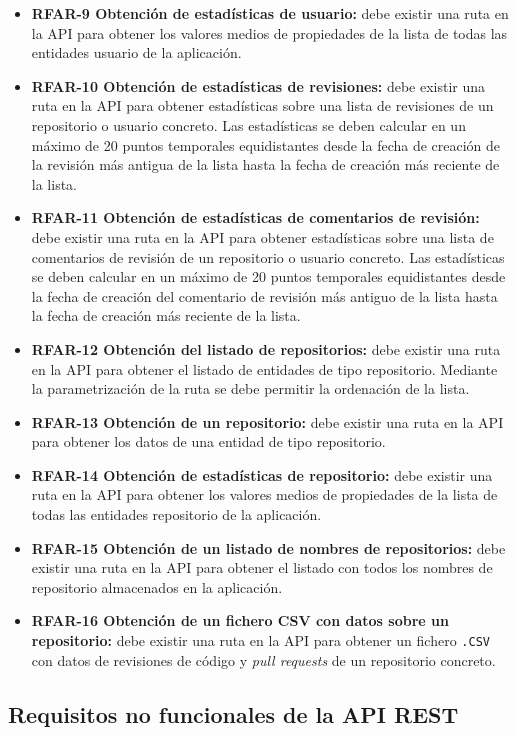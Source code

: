 \begin{itemize}
	\item \textbf{RFAR-9 Obtención de estadísticas de usuario:} debe existir una ruta en la API para obtener los valores medios de propiedades de la lista de todas las entidades usuario de la aplicación.
	\item \textbf{RFAR-10 Obtención de estadísticas de revisiones:} debe existir una ruta en la API para obtener estadísticas sobre una lista de revisiones de un repositorio o usuario concreto. Las estadísticas se deben calcular en un máximo de 20 puntos temporales equidistantes desde la fecha de creación de la revisión más antigua de la lista hasta la fecha de creación más reciente de la lista.
	\item \textbf{RFAR-11 Obtención de estadísticas de comentarios de revisión:} debe existir una ruta en la API para obtener estadísticas sobre una lista de comentarios de revisión de un repositorio o usuario concreto. Las estadísticas se deben calcular en un máximo de 20 puntos temporales equidistantes desde la fecha de creación del comentario de revisión más antiguo de la lista hasta la fecha de creación más reciente de la lista.
	\item \textbf{RFAR-12 Obtención del listado de repositorios:} debe existir una ruta en la API para obtener el listado de entidades de tipo repositorio. Mediante la parametrización de la ruta se debe permitir la ordenación de la lista.
	\item \textbf{RFAR-13 Obtención de un repositorio:} debe existir una ruta en la API para obtener los datos de una entidad de tipo repositorio.
	\item \textbf{RFAR-14 Obtención de estadísticas de repositorio:} debe existir una ruta en la API para obtener los valores medios de propiedades de la lista de todas las entidades repositorio de la aplicación.
	\item \textbf{RFAR-15 Obtención de un listado de nombres de repositorios:} debe existir una ruta en la API para obtener el listado con todos los nombres de repositorio almacenados en la aplicación.
	\item \textbf{RFAR-16 Obtención de un fichero CSV con datos sobre un repositorio:} debe existir una ruta en la API para obtener un fichero \texttt{.CSV} con datos de revisiones de código y \textit{pull requests} de un repositorio concreto.
\end{itemize}

\subsection{Requisitos no funcionales de la API REST}

